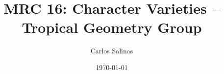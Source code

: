 \documentclass{amsart}
\theoremstyle{plain}
\theoremstyle{definition}
\begin{document}
\author{Carlos Salinas}
\title{MRC 16: Character Varieties -- Tropical Geometry Group}
\date{\today}

\maketitle
\begin{abstract}

\end{abstract}
\tableofcontents






% 
% 
\end{document}
